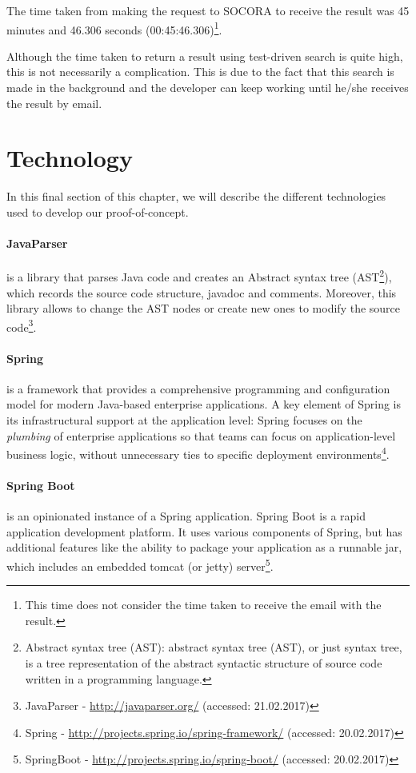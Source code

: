 The time taken from making the request to SOCORA to receive the result was 45 minutes and 46.306 seconds (00:45:46.306)\footnote{This time does not consider the time taken to receive the email with the result.}.

Although the time taken to return a result using test-driven search is quite high, this is not necessarily a complication. This is due to the fact that this search is made in the background and the developer can keep working until he/she receives the result by email.

\section{Technology}
In this final section of this chapter, we will describe the different technologies used to develop our proof-of-concept.

\paragraph{JavaParser}
is a library that parses Java code and creates an Abstract syntax tree (AST\footnote{Abstract syntax tree (AST): abstract syntax tree (AST), or just syntax tree, is a tree representation of the abstract syntactic structure of source code written in a programming language.}), which records the source code structure, javadoc and comments. Moreover, this library allows to change the AST nodes or create new ones to modify the source code\footnote{JavaParser - \url{http://javaparser.org/} (accessed: 21.02.2017)}.
\paragraph{Spring}
is a framework that provides a comprehensive programming and configuration model for modern Java-based enterprise applications. A key element of Spring is its infrastructural support at the application level: Spring focuses on the \emph{plumbing} of enterprise applications so that teams can focus on application-level business logic, without unnecessary ties to specific deployment environments\footnote{Spring - \url{http://projects.spring.io/spring-framework/} (accessed: 20.02.2017)}.
\paragraph{Spring Boot}
is an opinionated instance of a Spring application. Spring Boot is a rapid application development platform. It uses various components of Spring, but has additional features like the ability to package your application as a runnable jar, which includes an embedded tomcat (or jetty) server\footnote{SpringBoot - \url{http://projects.spring.io/spring-boot/} (accessed: 20.02.2017)}.
